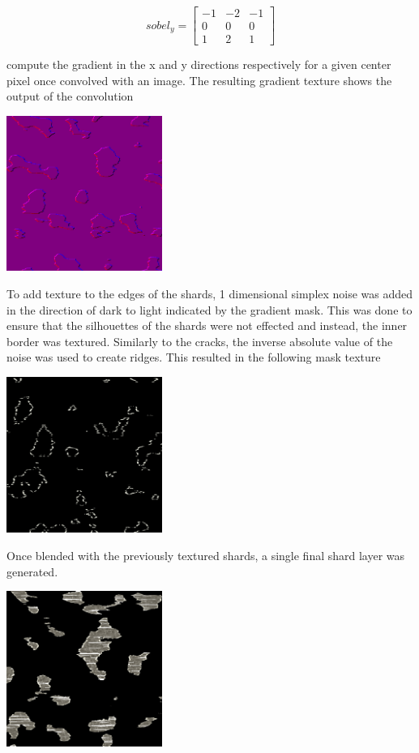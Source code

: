 \documentclass[a4paper, 11pt, titlepage]{article}
\begin{document}
\[
\textit{sobel}_y =
\begin{bmatrix}
-1 & -2 & -1 \\
0 & 0 & 0 \\
1 & 2 & 1
\end{bmatrix}
\]

compute the gradient in the x and y directions respectively for a given center
pixel once convolved with an image. The resulting gradient texture shows the
output of the convolution

 {
    \includegraphics[width=2.0in]{images/shard-gradients.png}
}

To add texture to the edges of the shards, 1 dimensional simplex noise was added
in the direction of dark to light indicated by the gradient mask. This was done
to ensure that the silhouettes of the shards were not effected and instead, the
inner border was textured.  Similarly to
the cracks, the inverse absolute value of the noise was used to create ridges. This resulted in the following mask texture

 {
    \includegraphics[width=2.0in]{images/jittered-shard-edges.png}
}

Once blended with the previously textured shards, a single final shard layer was
generated.

 {
    \includegraphics[width=2.0in]{images/textured-shards-with-edges.png}
}
\end{document}
